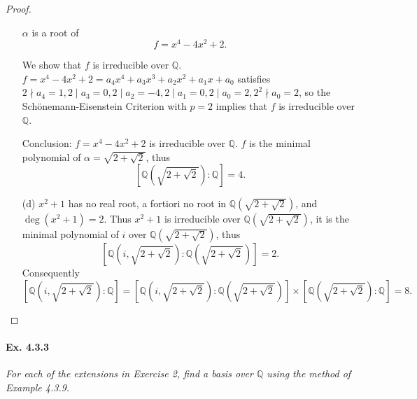 \documentclass[11pt,a4paper]{article}
\newcommand{\Q}{\mathbb{Q}}
\begin{document}
\begin{proof}
\begin{enumerate}
 $\alpha$ is a root of
$$f= x^4-4x^2+2.$$

We show that $f$ is irreducible over $\Q$.
$f= x^4-4x^2+2 = a_4x^4+a_3x^3+a_2x^2+a_1x+a_0$ satisfies
$2 \nmid a_4 =1, 2 \mid a_3=0,2\mid a_2=-4, 2 \mid a_1=0,2 \mid a_0=2,  2^2 \nmid a_0 = 2$, so 
the Sch\"onemann-Eisenstein Criterion with $p=2$ implies that $f$ is irreducible over $\mathbb{Q}$.


Conclusion: $f = x^4 -4x^2+2$ is irreducible over $\Q$. $f$ is the minimal polynomial of $\alpha = \sqrt{2+\sqrt{2}}$, thus
$$\left[\Q\left(\sqrt{2+\sqrt{2}}\right):\Q\right]=4.$$

\item[(d)]
$x^2+1$ has no real root, a fortiori no root in $\Q(\sqrt{2+\sqrt{2}})$, and $\deg(x^2+1) = 2$. Thus $x^2+1$ is irreducible over $\Q(\sqrt{2+\sqrt{2}})$, it is the minimal polynomial of $i$ over $\Q(\sqrt{2+\sqrt{2}})$, thus
$$\left [\Q\left(i,\sqrt{2+\sqrt{2}}\right):\Q\left(\sqrt{2+\sqrt{2}}\right)\right]=2.$$
Consequently
$$\left [\Q\left(i,\sqrt{2+\sqrt{2}}\right):\Q\right]=\left [\Q\left(i,\sqrt{2+\sqrt{2}}\right):\Q\left(\sqrt{2+\sqrt{2}}\right)\right] \times \left[\Q\left(\sqrt{2+\sqrt{2}}\right):\Q\right] = 8.$$
\end{enumerate}
\end{proof}

\paragraph{Ex. 4.3.3}

{\it For each of the extensions in Exercise 2, find a basis over $\Q$ using the method of Example 4.3.9.
}
\end{document}

